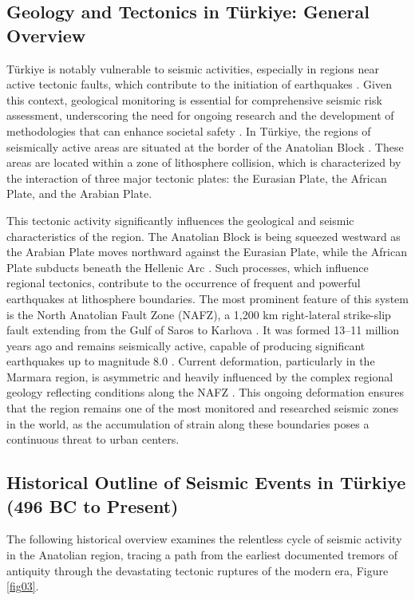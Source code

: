 \documentclass[data,article,submit,pdftex,moreauthors]{Definitions/mdpi}
\begin{document}
\subsection{Geology and Tectonics in Türkiye: General Overview}

Türkiye is notably vulnerable to seismic activities, especially in regions near active tectonic faults, which contribute to the initiation of earthquakes \cite{Basaran2014,Kandregula2024}. Given this context, geological monitoring is essential for comprehensive seismic risk assessment, underscoring the need for ongoing research and the development of methodologies that can enhance societal safety \cite{Korkmaz2013}. In Türkiye, the regions of seismically active areas are situated at the border of the Anatolian Block \cite{Jolivet2023}. These areas are located within a zone of lithosphere collision, which is characterized by the interaction of three major tectonic plates: the Eurasian Plate, the African Plate, and the Arabian Plate.

This tectonic activity significantly influences the geological and seismic characteristics of the region. The Anatolian Block is being squeezed westward as the Arabian Plate moves northward against the Eurasian Plate, while the African Plate subducts beneath the Hellenic Arc \cite{McKenzie1972, LePichon2010}. Such processes, which influence regional tectonics, contribute to the occurrence of frequent and powerful earthquakes at lithosphere boundaries. The most prominent feature of this system is the North Anatolian Fault Zone (NAFZ), a 1,200 km right-lateral strike-slip fault extending from the Gulf of Saros to Karlıova \cite{Barka1992, Sengor2005}. It was formed 13–11 million years ago and remains seismically active, capable of producing significant earthquakes up to magnitude 8.0 \cite{Stein1997}. Current deformation, particularly in the Marmara region, is asymmetric and heavily influenced by the complex regional geology reflecting conditions along the NAFZ \cite{Puccinelli2021}. This ongoing deformation ensures that the region remains one of the most monitored and researched seismic zones in the world, as the accumulation of strain along these boundaries poses a continuous threat to urban centers.

\subsection{Historical Outline of Seismic Events in Türkiye (496 BC to Present)}

The following historical overview examines the relentless cycle of seismic activity in the Anatolian region, tracing a path from the earliest documented tremors of antiquity through the devastating tectonic ruptures of the modern era, Figure \ref{fig03}. 
\end{document}
